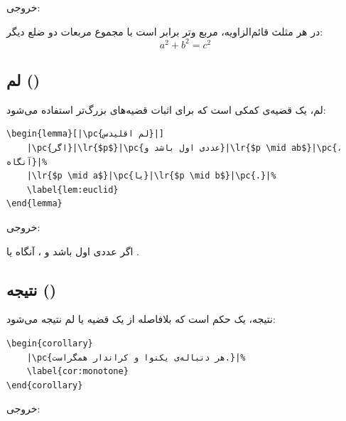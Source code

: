 خروجی:

\begin{theorem}
    در هر مثلث قائم‌الزاویه، مربع وتر برابر است با
    مجموع مربعات دو ضلع دیگر:
    \[
        a^{2} + b^{2} = c^{2}
    \]
    \label{thm:pythagoras-ch8}
\end{theorem}


\subsection{لم ()}
\label{sec:environments-lemma}

لم، یک قضیه‌ی کمکی است که برای اثبات قضیه‌های
بزرگ‌تر استفاده می‌شود:

\begin{latin}
\begin{verbatim}
\begin{lemma}[|\pc{لم اقلیدس}|]
    |\pc{اگر}|\lr{$p$}|\pc{عددی اول باشد و}|\lr{$p \mid ab$}|\pc{، آنگاه}|%
    |\lr{$p \mid a$}|\pc{یا}|\lr{$p \mid b$}|\pc{.}|%
    \label{lem:euclid}
\end{lemma}
\end{verbatim}
\end{latin}

خروجی:

\begin{lemma}[لم اقلیدس]
    اگر  عددی اول باشد و ،
    آنگاه  یا .
    \label{lem:euclid-ch8}
\end{lemma}

\subsection{نتیجه ()}
\label{sec:environments-corollary}

نتیجه، یک حکم است که بلافاصله از یک قضیه یا
لم نتیجه می‌شود:

\begin{latin}
\begin{verbatim}
\begin{corollary}
    |\pc{هر دنباله‌ی یکنوا و کراندار همگراست.}|%
    \label{cor:monotone}
\end{corollary}
\end{verbatim}
\end{latin}

خروجی:

